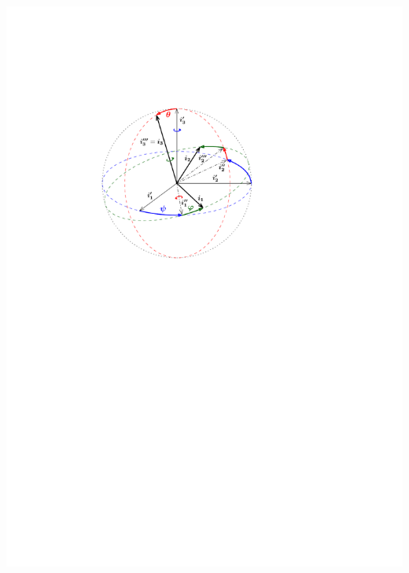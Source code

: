 \documentclass[draft,landscape,timbord]{notes}
\begin{document}
\begin{multicols*}{3}
\begin{enumerate}
    \includegraphics[width=1.0\linewidth]{euler_ang.pdf}


\end{enumerate}
\end{multicols*}
\end{document}
